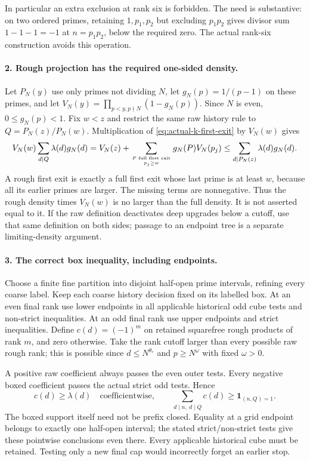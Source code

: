 In particular an extra exclusion at rank six is forbidden. The need is
substantive: on two ordered primes, retaining $1,p_1,p_2$ but excluding
$p_1p_2$ gives divisor sum $1-1-1=-1$ at $n=p_1p_2$, below the required
zero. The actual rank-six construction avoids this operation.

\paragraph{2. Rough projection has the required one-sided density.}
Let $P_N(y)$ use only primes not dividing $N$, let
$g_N(p)=1/(p-1)$ on these primes, and let
$V_N(y)=\prod_{p<y,p\nmid N}(1-g_N(p))$. Since $N$ is even,
$0\le g_N(p)<1$. Fix $w<z$ and restrict the same raw history rule
to $Q=P_N(z)/P_N(w)$. Multiplication of
\eqref{eq:actual-k-first-exit} by $V_N(w)$ gives
\[
 V_N(w)\sum_{d\mid Q}\lambda(d)g_N(d)
 =V_N(z)+\sum_{P\text{ full first exit}\atop p_j\ge w}
                g_N(P)V_N(p_j)
 \le \sum_{d\mid P_N(z)}\lambda(d)g_N(d).
\]
A rough first exit is exactly a full first exit whose last prime is
at least $w$, because all its earlier primes are larger. The missing
terms are nonnegative. Thus the rough density times $V_N(w)$ is no
larger than the full density. It is not asserted equal to it.
If the raw definition deactivates deep upgrades below a cutoff, use
that same definition on both sides; passage to an endpoint tree is a
separate limiting-density argument.

\paragraph{3. The correct box inequality, including endpoints.}
Choose a finite fine partition into disjoint half-open prime intervals,
refining every coarse label. Keep each coarse history decision fixed
on its labelled box. At an even final rank use lower endpoints in all
applicable historical odd cube tests and non-strict inequalities. At
an odd final rank use upper endpoints and strict inequalities. Define
$c(d)=(-1)^m$ on retained squarefree rough products of rank $m$, and
zero otherwise. Take the rank cutoff larger than every possible raw
rough rank; this is possible since $d\le N^{\theta_*}$ and
$p\ge N^\omega$ with fixed $\omega>0$.

A positive raw coefficient always passes the even outer tests. Every
negative boxed coefficient passes the actual strict odd tests. Hence
\[
 c(d)\ge\lambda(d)\quad\text{coefficientwise},\qquad
 \sum_{d\mid n,\ d\mid Q}c(d)\ge\mathbf1_{(n,Q)=1}.
\]
The boxed support itself need not be prefix closed. Equality at a
grid endpoint belongs to exactly one half-open interval; the stated
strict/non-strict tests give these pointwise conclusions even there.
Every applicable historical cube must be retained. Testing only a
new final cap would incorrectly forget an earlier stop.


